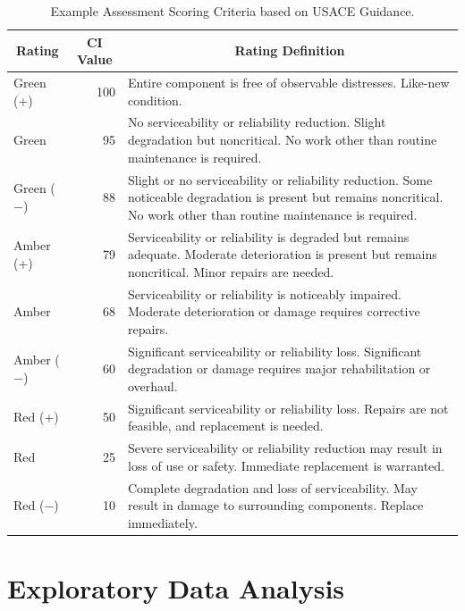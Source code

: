 \documentclass[NewProceedings,letterpaper,NoPageNumbers,NoLineNumbers, DoubleSpace]{ascelike-new}
\begin{document}
\begin{table}[htbp]
\caption{Example Assessment Scoring Criteria based on USACE Guidance.}
\label{table:AssessmentScores}
\centering
\small
\renewcommand{\arraystretch}{1.25}
\begin{tabular}{l r p{3.5in}}
\hline\hline
\multicolumn{1}{c}{Rating} &
\multicolumn{1}{c}{CI Value} &
\multicolumn{1}{c}{Rating Definition} \\
\hline
Green (+) & 100 & Entire component is free of observable distresses. Like-new condition. \\
Green & 95 & No serviceability or reliability reduction. Slight degradation but noncritical. No work other than routine maintenance is required. \\
Green ($-$) & 88 & Slight or no serviceability or reliability reduction. Some noticeable degradation is present but remains noncritical. No work other than routine maintenance is required. \\
Amber (+) & 79 & Serviceability or reliability is degraded but remains adequate. Moderate deterioration is present but remains noncritical. Minor repairs are needed. \\
Amber & 68 & Serviceability or reliability is noticeably impaired. Moderate deterioration or damage requires corrective repairs. \\
Amber ($-$) & 60 & Significant serviceability or reliability loss. Significant degradation or damage requires major rehabilitation or overhaul. \\
Red (+) & 50 & Significant serviceability or reliability loss. Repairs are not feasible, and replacement is needed. \\
Red & 25 & Severe serviceability or reliability reduction may result in loss of use or safety. Immediate replacement is warranted. \\
Red ($-$) & 10 & Complete degradation and loss of serviceability. May result in damage to surrounding components. Replace immediately. \\
\hline\hline
\end{tabular}
\normalsize
\end{table}

\FloatBarrier

\section{Exploratory Data Analysis}
\end{document}
